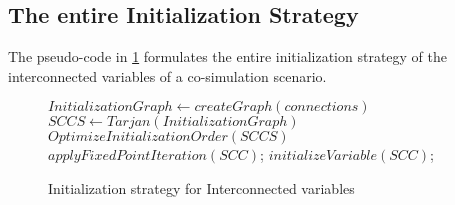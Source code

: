 \subsection{The entire Initialization Strategy}
The pseudo-code in \cref{alg:initialization} formulates the entire initialization strategy of the interconnected variables of a co-simulation scenario.
\begin{figure}[H]
  \centering
    \begin{algorithm}[H]
    \caption{Initialization strategy for Interconnected variables}
    \label{alg:initialization}
      \begin{algorithmic}[1]
        \State $InitializationGraph \gets createGraph(connections)$
        \State $SCCS \gets Tarjan(InitializationGraph)$
        \State $OptimizeInitializationOrder(SCCS)$
                \State $applyFixedPointIteration(SCC)$;
            \Else
                \State $initializeVariable(SCC)$;
            \EndIf
        \EndFor
        \end{algorithmic}
    \end{algorithm}
\end{figure}